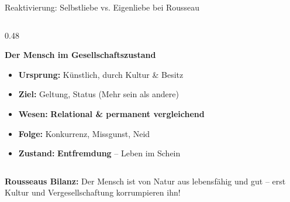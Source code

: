 \documentclass[aspectratio=169, 10pt]{beamer}
\begin{document}
\begin{frame}{Reaktivierung: Selbstliebe vs. Eigenliebe bei Rousseau}
\begin{columns}[T]
        \begin{column}{0.48\textwidth}
            \begin{tcolorbox}[rousseauCulture, title={\faMask\ amour-propre (Eigenliebe / Selbstsucht)}]
                \textbf{Der Mensch im Gesellschaftszustand}
                \begin{itemize}\setlength{\itemsep}{1pt}\footnotesize
                    \item \textbf{Ursprung:} Künstlich, durch Kultur \& Besitz
                    \item \textbf{Ziel:} Geltung, Status (\glqq Mehr sein als andere\grqq)
                    \item \textbf{Wesen:} \textcolor{accentRed}{\textbf{Relational \& permanent vergleichend}}
                    \item \textbf{Folge:} Konkurrenz, Missgunst, Neid
                    \item \textbf{Zustand:} \textbf{Entfremdung} – Leben im Schein
                \end{itemize}
            \end{tcolorbox}
        \end{column}
    \end{columns}

    \vspace{0.15cm}
    \begin{tcolorbox}[enhanced, colframe=primaryBlue, colback=lightBlue, arc=2mm, boxrule=0.6pt, left=6pt, right=6pt, top=2pt, bottom=2pt]
        \centering\footnotesize
        \textbf{Rousseaus Bilanz:} Der Mensch ist von Natur aus lebensfähig und gut – erst Kultur und Vergesellschaftung korrumpieren ihn!
    \end{tcolorbox}
\end{frame}
\end{document}
